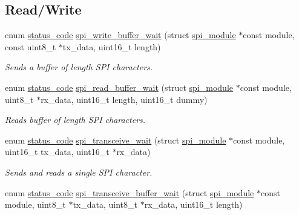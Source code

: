 \subsection*{Read/\+Write}
\begin{DoxyCompactItemize}
\item 
enum \mbox{\hyperlink{group__group__sam0__utils__status__codes_ga751c892e5a46b8e7d282085a5a5bf151}{status\+\_\+code}} \mbox{\hyperlink{group__asfdoc__sam0__sercom__spi__group_gae217dcf01506d2ad9ea554a14e57245f}{spi\+\_\+write\+\_\+buffer\+\_\+wait}} (struct \mbox{\hyperlink{structspi__module}{spi\+\_\+module}} $\ast$const module, const uint8\+\_\+t $\ast$tx\+\_\+data, uint16\+\_\+t length)
\begin{DoxyCompactList}\small\item\em Sends a buffer of {\ttfamily length} S\+PI characters. \end{DoxyCompactList}\item 
enum \mbox{\hyperlink{group__group__sam0__utils__status__codes_ga751c892e5a46b8e7d282085a5a5bf151}{status\+\_\+code}} \mbox{\hyperlink{group__asfdoc__sam0__sercom__spi__group_ga7cdeea24cfa24ab872044c6fa1ae893f}{spi\+\_\+read\+\_\+buffer\+\_\+wait}} (struct \mbox{\hyperlink{structspi__module}{spi\+\_\+module}} $\ast$const module, uint8\+\_\+t $\ast$rx\+\_\+data, uint16\+\_\+t length, uint16\+\_\+t dummy)
\begin{DoxyCompactList}\small\item\em Reads buffer of {\ttfamily length} S\+PI characters. \end{DoxyCompactList}\item 
enum \mbox{\hyperlink{group__group__sam0__utils__status__codes_ga751c892e5a46b8e7d282085a5a5bf151}{status\+\_\+code}} \mbox{\hyperlink{group__asfdoc__sam0__sercom__spi__group_ga3eb1d72360e67b6fef7574320a5919e6}{spi\+\_\+transceive\+\_\+wait}} (struct \mbox{\hyperlink{structspi__module}{spi\+\_\+module}} $\ast$const module, uint16\+\_\+t tx\+\_\+data, uint16\+\_\+t $\ast$rx\+\_\+data)
\begin{DoxyCompactList}\small\item\em Sends and reads a single S\+PI character. \end{DoxyCompactList}\item 
enum \mbox{\hyperlink{group__group__sam0__utils__status__codes_ga751c892e5a46b8e7d282085a5a5bf151}{status\+\_\+code}} \mbox{\hyperlink{group__asfdoc__sam0__sercom__spi__group_gad784fee69a16acef8e4e3b8be4a4d61d}{spi\+\_\+transceive\+\_\+buffer\+\_\+wait}} (struct \mbox{\hyperlink{structspi__module}{spi\+\_\+module}} $\ast$const module, uint8\+\_\+t $\ast$tx\+\_\+data, uint8\+\_\+t $\ast$rx\+\_\+data, uint16\+\_\+t length)

\end{DoxyCompactItemize}
